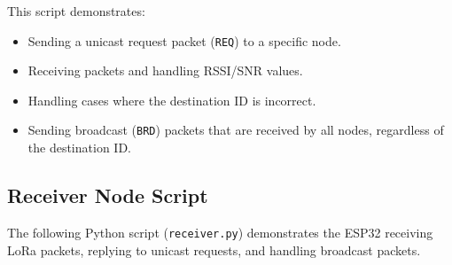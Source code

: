 This script demonstrates:
\begin{itemize}
    \item Sending a unicast request packet (\texttt{REQ}) to a specific node.
    \item Receiving packets and handling RSSI/SNR values.
    \item Handling cases where the destination ID is incorrect.
    \item Sending broadcast (\texttt{BRD}) packets that are received by all nodes, regardless of the destination ID.
\end{itemize}

\subsection{Receiver Node Script}

The following Python script (\texttt{receiver.py}) demonstrates the ESP32 receiving LoRa packets, replying to unicast requests, and handling broadcast packets.

